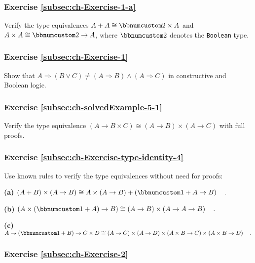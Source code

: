 \subsubsection{Exercise \label{subsec:ch-Exercise-1-a}\ref{subsec:ch-Exercise-1-a}}

Verify the type equivalences $A+A\cong\bbnum 2\times A$ and $A\times A\cong\bbnum 2\rightarrow A$,
where $\bbnum 2$ denotes the \lstinline!Boolean! type.

\subsubsection{Exercise \label{subsec:ch-Exercise-1}\ref{subsec:ch-Exercise-1}}

Show that $A\Rightarrow(B\vee C)\neq(A\Rightarrow B)\wedge(A\Rightarrow C)$
in constructive and Boolean logic.

\subsubsection{Exercise \label{subsec:ch-solvedExample-5-1}\ref{subsec:ch-solvedExample-5-1}}

Verify the type equivalence $\left(A\rightarrow B\times C\right)\cong\left(A\rightarrow B\right)\times\left(A\rightarrow C\right)$
with full proofs.

\subsubsection{Exercise \label{subsec:ch-Exercise-type-identity-4}\ref{subsec:ch-Exercise-type-identity-4}}

Use known rules to verify the type equivalences without need for proofs:

\textbf{(a)} $\left(A+B\right)\times\left(A\rightarrow B\right)\cong A\times\left(A\rightarrow B\right)+\left(\bbnum 1+A\rightarrow B\right)\quad.$

\textbf{(b)} $\left(A\times(\bbnum 1+A)\rightarrow B\right)\cong\left(A\rightarrow B\right)\times\left(A\rightarrow A\rightarrow B\right)\quad.$

\textbf{(c)} $A\rightarrow\left(\bbnum 1+B\right)\rightarrow C\times D\cong\left(A\rightarrow C\right)\times\left(A\rightarrow D\right)\times\left(A\times B\rightarrow C\right)\times\left(A\times B\rightarrow D\right)\quad.$

\subsubsection{Exercise \label{subsec:ch-Exercise-2}\ref{subsec:ch-Exercise-2}}

